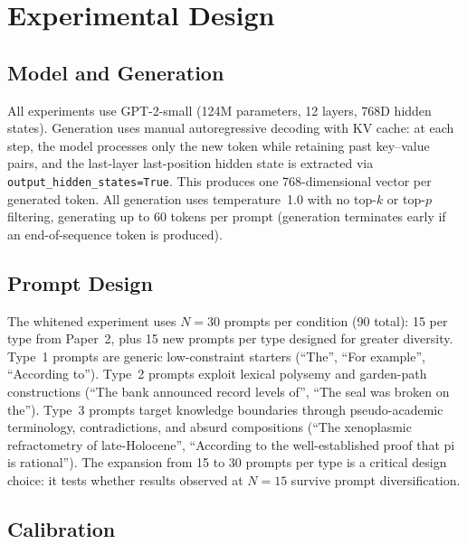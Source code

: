 \documentclass[11pt]{article}
\begin{document}

\section{Experimental Design}

\subsection{Model and Generation}

All experiments use GPT-2-small \citep{radford2019language, vaswani2017attention} (124M parameters, 12 layers, 768D hidden states). Generation uses manual autoregressive decoding with KV cache: at each step, the model processes only the new token while retaining past key--value pairs, and the last-layer last-position hidden state is extracted via \texttt{output\_hidden\_states=True}. This produces one 768-dimensional vector per generated token. All generation uses temperature~1.0 with no top-$k$ or top-$p$ filtering, generating up to 60 tokens per prompt (generation terminates early if an end-of-sequence token is produced).

\subsection{Prompt Design}

The whitened experiment uses $N = 30$ prompts per condition (90 total): 15 per type from Paper~2, plus 15 new prompts per type designed for greater diversity. Type~1 prompts are generic low-constraint starters (``The'', ``For example'', ``According to''). Type~2 prompts exploit lexical polysemy and garden-path constructions (``The bank announced record levels of'', ``The seal was broken on the''). Type~3 prompts target knowledge boundaries through pseudo-academic terminology, contradictions, and absurd compositions (``The xenoplasmic refractometry of late-Holocene'', ``According to the well-established proof that pi is rational''). The expansion from 15 to 30 prompts per type is a critical design choice: it tests whether results observed at $N = 15$ survive prompt diversification.

\subsection{Calibration}
\end{document}
